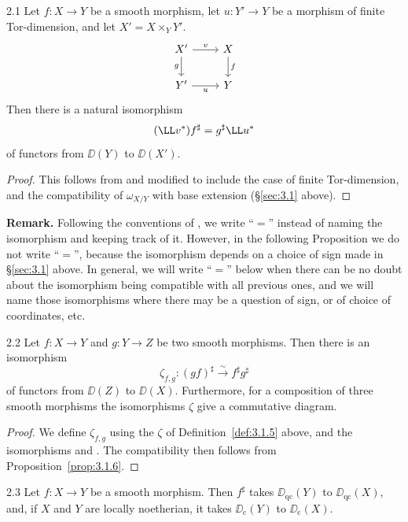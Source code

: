 \begin{bookproposition}{2.1}\label{prop:3.2.1}
Let $f\colon X\to Y$ be a smooth morphism, let $u\colon Y'\to Y$ be a morphism of finite Tor-dimension, and let $X'=X\times_Y Y'$.
\[
\begin{tikzcd}
	X' \arrow[r, "v"] \arrow[d, "g"'] & X \arrow[d, "f"] \\
	Y' \arrow[r, "u"'] & Y
\end{tikzcd}
\]
Then there is a natural isomorphism
\[
(\LL v^*)f^{\sharp} = g^{\sharp}\LL u^*
\]
of functors from $\DD(Y)$ to $\DD(X')$.
\end{bookproposition}

\begin{proof}
This follows from  and  modified to include the case of finite Tor-dimension, and the compatibility of $\omega_{X/Y}$ with base extension (\S\ref{sec:3.1} above).
\end{proof}

\textbf{Remark.}
Following the conventions of , we write ``$=$'' instead of naming the isomorphism and keeping track of it. However, in the following Proposition we do not write ``$=$'', because the isomorphism depends on a choice of sign made in \S\ref{sec:3.1} above. In general, we will write ``$=$'' below when there can be no doubt about the isomorphism being compatible with all previous ones, and we will name those isomorphisms where there may be a question of sign, or of choice of coordinates, etc.

\begin{bookproposition}{2.2}\label{prop:3.2.2}
Let $f\colon X\to Y$ and $g\colon Y\to Z$ be two smooth morphisms. Then there is an isomorphism
\[
\zeta_{f,g}\colon (gf)^{\sharp} \xrightarrow{\sim} f^{\sharp}g^{\sharp}
\]
of functors from $\DD(Z)$ to $\DD(X)$. Furthermore, for a composition of three smooth morphisms the isomorphisms $\zeta$ give a commutative diagram.
\end{bookproposition}

\begin{proof}
We define $\zeta_{f,g}$ using the $\zeta$ of Definition~\ref{def:3.1.5} above, and the isomorphisms  and . The compatibility then follows from Proposition~\ref{prop:3.1.6}.
\end{proof}

\begin{bookproposition}{2.3}\label{prop:3.2.3}
Let $f\colon X\to Y$ be a smooth morphism. Then $f^{\sharp}$ takes $\DD_{\mathrm{qc}}(Y)$ to $\DD_{\mathrm{qc}}(X)$, and, if $X$ and $Y$ are locally noetherian, it takes $\DD_{\mathrm{c}}(Y)$ to $\DD_{\mathrm{c}}(X)$.
\end{bookproposition}

